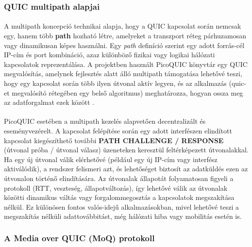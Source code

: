 \documentclass[a4paper,oneside]{article}
\begin{document}
\subsubsection{QUIC multipath alapjai}
\paragraph{}
A multipath koncepció technikai alapja, hogy a QUIC kapcsolat során nemcsak egy, 
hanem több \textbf{path}
hozható létre, amelyeket a transzport réteg párhuzamosan vagy dinamikusan képes használni. 
Egy \emph{path} definíció szerint egy adott forrás-cél IP-cím és port kombináció, azaz 
különböző fizikai vagy logikai hálózati kapcsolatok reprezentálása. 
A projektben használt PicoQUIC könyvtár egy QUIC megvalósítás, amelynek fejlesztés alatt álló multipath 
támogatása lehetővé teszi, hogy egy kapcsolat során több ilyen útvonal aktív legyen, és az 
alkalmazás (quic-et megvalósító rétegében egy belső algoritmus) meghatározza, 
hogyan ossza meg az adatforgalmat ezek között \cite{pico_git}.
\paragraph{}
PicoQUIC esetében a multipath kezelés alapvetően decentralizált és eseményvezérelt. 
A kapcsolat felépítése során egy adott interfészen elindított kapcsolat kiegészíthető 
további \textbf{PATH CHALLENGE / RESPONSE} (útvonal próba / útvonal válasz) üzeneteken keresztül feltérképezett 
útvonalakkal. Ha egy új útvonal válik elérhetővé (például egy új IP-cím vagy interfész 
aktiválódik), a rendszer felismeri azt, és lehetőséget biztosít az adatküldés ezen 
az útvonalon történő elindítására. Az útvonalak állapotát folyamatosan figyeli a protokoll 
(RTT, veszteség, állapotváltozás), így lehetővé válik az útvonalak közötti dinamikus 
váltás vagy forgalommegosztás a kapcsolatok megszakítása nélkül. Ez különösen 
fontos valós-idejű alkalmazásokban, mivel lehetővé teszi a megszakítás nélküli adattovábbitást, 
még hálózati hiba vagy mobilitás esetén is.

\subsubsection{A Media over QUIC (MoQ) protokoll}
\paragraph{}
\end{document}
